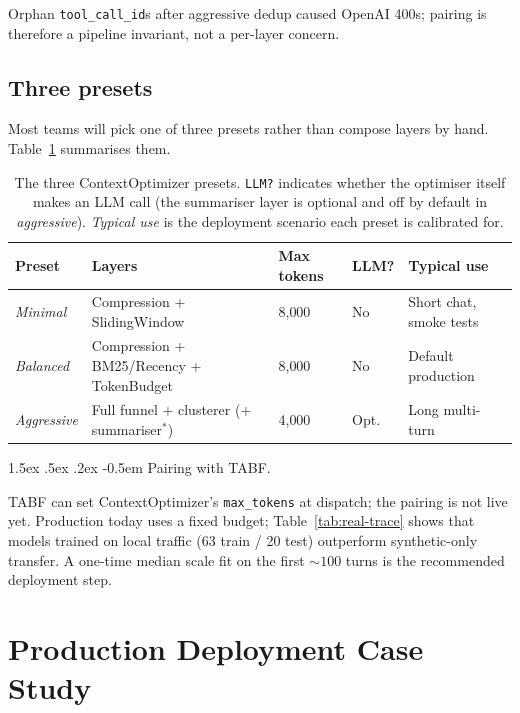 \documentclass{article}
\makeatletter
\newcommand{\code}[1]{\texttt{\small #1}}
\renewcommand\paragraph{%
  \@startsection{paragraph}{4}{\z@}%
    {1.5ex \@plus.5ex \@minus.2ex}%
    {-0.5em}%
    {\normalfont\normalsize\bfseries}%
}
\makeatother
\begin{document}
Orphan \code{tool\_call\_id}s after aggressive dedup caused OpenAI 400s;
pairing is therefore a pipeline invariant, not a per-layer concern.

\subsection{Three presets}

Most teams will pick one of three presets rather than compose layers by
hand. Table~\ref{tab:presets} summarises them.

\begin{table}[h]
  \caption{The three ContextOptimizer presets. \code{LLM?} indicates
  whether the optimiser itself makes an LLM call (the summariser layer
  is optional and off by default in \emph{aggressive}). \emph{Typical
  use} is the deployment scenario each preset is calibrated for.}
  \label{tab:presets}
  \centering
  \footnotesize
  \begin{tabular}{lllll}
    \toprule
    Preset & Layers & Max tokens & LLM? & Typical use \\
    \midrule
    \emph{Minimal}    & Compression + SlidingWindow                    & 8{,}000 & No   & Short chat, smoke tests \\
    \emph{Balanced}   & Compression + BM25/Recency + TokenBudget       & 8{,}000 & No   & Default production \\
    \emph{Aggressive} & Full funnel + clusterer (+ summariser$^*$)     & 4{,}000 & Opt. & Long multi-turn \\
    \bottomrule
  \end{tabular}
\end{table}

\paragraph{Pairing with TABF.}
\label{sec:pairing}

TABF can set ContextOptimizer's \code{max\_tokens} at dispatch; the
pairing is not live yet. Production today uses a fixed budget;
Table~\ref{tab:real-trace} shows that models trained on local traffic
(63 train / 20 test) outperform synthetic-only transfer. A one-time
median scale fit on the first ${\sim}100$ turns is the recommended
deployment step.

\section{Production Deployment Case Study}
\label{sec:production}
\end{document}
